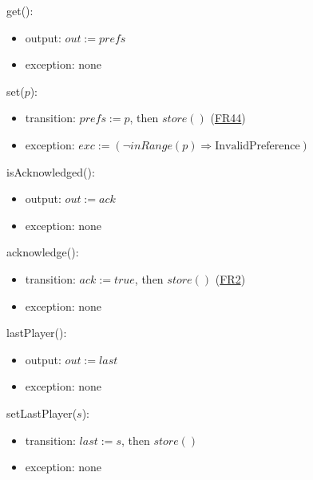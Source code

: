 \documentclass[10pt, titlepage]{article}
\newcommand{\srsurl}{https://team-hindsight.github.io/ophthamology-game/SRS/SRS.pdf}
\newcommand{\srsitemref}[2]{\href{\srsurl\#nameddest=#1}{#2}}
\newcommand{\T}[1]{\mathit{#1}}          %
\newcommand{\out}{\mathit{out}}
\newcommand{\exc}{\mathit{exc}}
\newcommand{\true}{\mathit{true}}
\begin{document}
\begin{samepage}
\noindent get():
\begin{itemize}
\item output: $\out := \T{prefs}$
\item exception: none
\end{itemize}
\end{samepage}
\par\pagebreak[0]

\begin{samepage}
\noindent set($p$):
\begin{itemize}
\item transition: $\T{prefs} := p$, then $\T{store}()$ (\srsitemref{FR_Preferences}{FR44})
\item exception: $\exc := (\neg\T{inRange}(p) \Rightarrow \text{InvalidPreference})$
\end{itemize}
\end{samepage}
\par\pagebreak[0]

\begin{samepage}
\noindent isAcknowledged():
\begin{itemize}
\item output: $\out := \T{ack}$
\item exception: none
\end{itemize}
\end{samepage}
\par\pagebreak[0]

\begin{samepage}
\noindent acknowledge():
\begin{itemize}
\item transition: $\T{ack} := \true$, then $\T{store}()$ (\srsitemref{FR_RecordAck}{FR2})
\item exception: none
\end{itemize}
\end{samepage}
\par\pagebreak[0]

\begin{samepage}
\noindent lastPlayer():
\begin{itemize}
\item output: $\out := \T{last}$
\item exception: none
\end{itemize}
\end{samepage}
\par\pagebreak[0]

\begin{samepage}
\noindent setLastPlayer($s$):
\begin{itemize}
\item transition: $\T{last} := s$, then $\T{store}()$
\item exception: none
\end{itemize}
\end{samepage}
\par\pagebreak[0]
\end{document}
